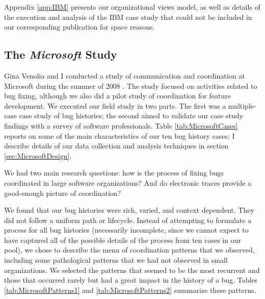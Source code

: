 Appendix \ref{app:IBM} presents our organizational views model, as well as details of the execution and analysis of the IBM case study that could not be included in our corresponding publication \cite{Aranda2007b} for space reasons.


\subsection{The \emph{Microsoft} Study}
\label{sec:Microsoft}

Gina Venolia and I conducted a study of communication and coordination at Microsoft during the summer of 2008 \cite{Aranda2009}. The study focused on activities related to bug fixing, although we also did a pilot study of coordination for feature development. We executed our field study in two parts. The first was a multiple-case case study of bug histories; the second aimed to validate our case study findings with a survey of software professionals. Table \ref{tab:MicrosoftCases} reports on some of the main characteristics of our ten bug history cases; I describe details of our data collection and analysis techniques in section \ref{sec:MicrosoftDesign}.

We had two main research questions: how is the process of fixing bugs coordinated in large software organizations? And do electronic traces provide a good-enough picture of coordination?

We found that our bug histories were rich, varied, and context dependent. They did not follow a uniform path or lifecycle. Instead of attempting to formulate a process for all bug histories (necessarily incomplete, since we cannot expect to have captured all of the possible details of the process from ten cases in our pool), we chose to describe the menu of coordination patterns that we observed, including some pathological patterns that we had not observed in small organizations. We selected the patterns that seemed to be the most recurrent and those that occurred rarely but had a great impact in the history of a bug. Tables \ref{tab:MicrosoftPatterns1} and \ref{tab:MicrosoftPatterns2} summarize these patterns.


